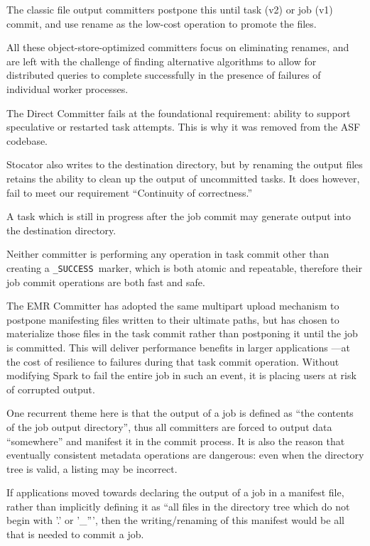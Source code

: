 \documentclass[format=acmsmall, screen=true, review=false]{acmart}
\newcommand{\SUCCESS}{\texttt{\_SUCCESS}\ }
\begin{document}
The classic file output committers postpone this until task (v2) or job (v1)
commit, and use rename as the low-cost operation to promote the files.

All these object-store-optimized committers focus on eliminating renames,
and are left with the challenge of finding alternative algorithms to
allow for distributed queries to complete successfully in the presence
of failures of individual worker processes.


The Direct Committer fails at the foundational requirement: ability to support
speculative or restarted task attempts.
This is why it was removed from the ASF codebase.

Stocator also writes to the destination directory, but by renaming the output
files retains the ability to clean up the output of uncommitted tasks.
It does however, fail to meet our requirement ``Continuity of correctness.''

A task which is still in progress after the job commit may generate output
into the destination directory.

Neither committer is performing any operation in task commit other than creating
a \SUCCESS marker, which is both atomic and repeatable, therefore their job commit
operations are both fast and safe.

The EMR Committer has adopted the same multipart upload mechanism to postpone
manifesting files written to their ultimate paths, but has chosen to materialize
those files in the task commit rather than postponing it until the job is committed.
This will deliver performance benefits in larger applications ---at the cost
of resilience to failures during that task commit operation.
Without modifying Spark to fail the entire job in such an event, it is placing
users at risk of corrupted output.


One recurrent theme here is that the output of a job is defined as
``the contents of the job output directory'', thus all committers are
forced to output data ``somewhere'' and manifest it in the commit process.
It is also the reason that eventually consistent metadata operations are
dangerous: even when the directory tree is valid, a listing may be incorrect.

If applications moved towards declaring the output of a job in
a manifest file, rather than implicitly defining it as ``all files in the directory
tree which do not begin with '.' or '\_''', then the writing/renaming
of this manifest would be all that is needed to commit a job.
\end{document}
